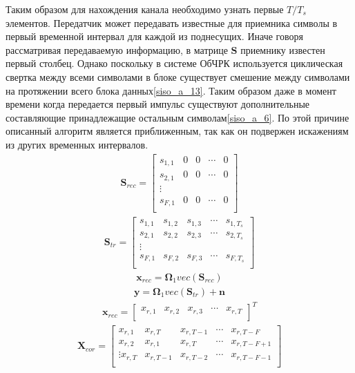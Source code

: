  Таким образом для нахождения канала необходимо узнать первые $T/T_s$ элементов.
Передатчик может передавать известные для приемника символы в первый временной интервал для каждой из поднесущих. Иначе говоря рассматривая передаваемую информацию, в матрице $\mathbf{S}$ приемнику известен первый столбец. Однако поскольку в системе ОбЧРК используется циклическая свертка между всеми символами в блоке существует смешение между символами на протяжении всего блока данных\eqref{siso_a_13}\cite{Book23}. Таким образом даже в момент времени когда передается первый импульс существуют дополнительные составляющие принадлежащие остальным символам\eqref{siso_a_6}. По этой причине описанный алгоритм является приближенным, так как он подвержен искажениям из других временных интервалов. 
\begin{align}
\mathbf{S}_{rec}=\begin{bmatrix}
s_{1,1}&0&0&\cdots &0\\
s_{2,1}&0&0&\cdots &0\\
\vdots\\
s_{F,1}&0&0&\cdots &0\\
\end{bmatrix}\label{siso_a_5}
\end{align}
\begin{align}
\mathbf{S}_{tr}=\begin{bmatrix}
s_{1,1}&s_{1,2}&s_{1,3}&\cdots &s_{1,T_s}\\
s_{2,1}&s_{2,2}&s_{2,3}&\cdots &s_{2,T_s}\\
\vdots\\
s_{F,1}&s_{F,2}&s_{F,3}&\cdots &s_{F,T_s}\\
\end{bmatrix}\label{siso_a_6}
\end{align}
\begin{align}
\mathbf{x}_{rec}=\mathbf{\Omega}_1vec(\mathbf{S}_{rec})\label{siso_a_7}
\end{align}
\begin{align}
\mathbf{y}=\mathbf{\Omega}_1vec(\mathbf{S}_{tr})+\mathbf{n}\label{siso_a_8}
\end{align}
\begin{align}
\mathbf{x}_{rec}=\begin{bmatrix}
x_{r,1}&x_{r,2}&x_{r,3}&\cdots&x_{r,T}\\
\end{bmatrix}^T\label{siso_a_9}
\end{align}
\begin{align}
\mathbf{X}_{cor}=\begin{bmatrix}
x_{r,1}&x_{r,T}&x_{r,T-1}&\cdots & x_{r,T-F}\\
x_{r,2}&x_{r,1}&x_{r,T}&\cdots & x_{r,T-F+1}\\
\vdots
x_{r,T}&x_{r,T-1}&x_{r,T-2}&\cdots & x_{r,T-F-1}\\
\end{bmatrix}\label{siso_a_10}
\end{align}
